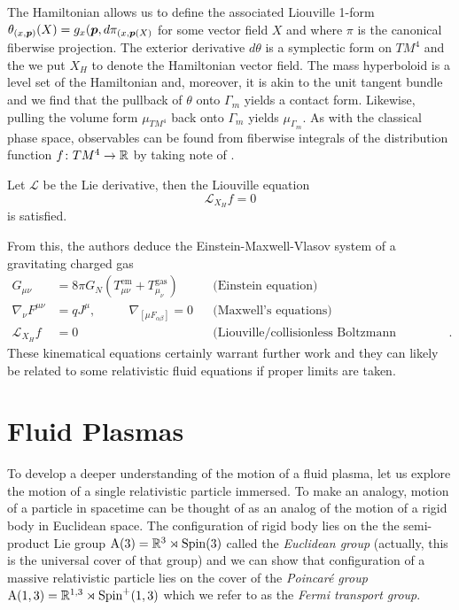 \documentclass[conf]{new-aiaa}
\begin{document}
The Hamiltonian allows us to define the associated Liouville 1-form $\theta_{(x,\boldsymbol{p})}(X)=g_x(\boldsymbol{p}, d\pi_{(x,\boldsymbol{p}(X)}$ for some vector field $X$ and where $\pi$ is the canonical fiberwise projection. The exterior derivative $d\theta$ is a symplectic form on $TM^4$ and the we put $X_H$ to denote the Hamiltonian vector field. The mass hyperboloid is a level set of the Hamiltonian and, moreover, it is akin to the unit tangent bundle and we find that the pullback of $\theta$ onto $\Gamma_m$ yields a contact form. Likewise, pulling the volume form $\mu_{TM^4}$ back onto $\Gamma_m$ yields $\mu_{\Gamma_m}$. As with the classical phase space, observables can be found from fiberwise integrals of the distribution function $f\colon TM^4\to \mathbb{R}$ by taking note of \cite[Lemma 4, Lemma 5]{sarbach_relativistic_2013}.
\begin{theorem}
Let $\mathcal{L}$ be the Lie derivative, then the Liouville equation 
\begin{equation}
    \mathcal{L}_{X_H} f = 0
\end{equation}
is satisfied.
\end{theorem}
From this, the authors deduce the Einstein-Maxwell-Vlasov system of a gravitating charged gas
\begin{align}
    G_{\mu \nu} &= 8\pi G_N \left(T_{\mu \nu}^{\textrm{em}} + T_{\mu_\nu}^{\textrm{gas}}\right) && \textrm{(Einstein equation)}\\
    \nabla_\nu F^{\mu \nu} &= q J^\mu,\qquad ~~~ \nabla_{[\mu F_{\alpha \beta}]}=0 && \textrm{(Maxwell's equations)}\\
    \mathcal{L}_{X_H}f &=0 &&\textrm{(Liouville/collisionless Boltzmann equation)}.
\end{align}
These kinematical equations certainly warrant further work and they can likely be related to some relativistic fluid equations if proper limits are taken.





\section{Fluid Plasmas}
\label{sec:spinor_equations}

To develop a deeper understanding of the motion of a fluid plasma, let us explore the motion of a single relativistic particle immersed. To make an analogy, motion of a particle in spacetime can be thought of as an analog of the motion of a rigid body in Euclidean space. The configuration of rigid body lies on the the semi-product Lie group $\mathrm{A}(3)=\mathbb{R}^3 \rtimes \operatorname{Spin}(3)$ called the \emph{Euclidean group} (actually, this is the universal cover of that group) and we can show that configuration of a massive relativistic particle lies on the cover of the \emph{Poincar\'e group} $\mathrm{A}(1,3) = \mathbb{R}^{1,3} \rtimes \operatorname{Spin}^+(1,3)$ which we refer to as the \emph{Fermi transport group}.
\end{document}
